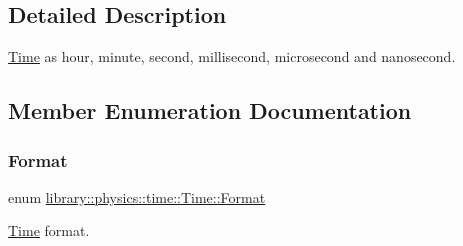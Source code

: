 \subsection{Detailed Description}
\hyperlink{classlibrary_1_1physics_1_1time_1_1_time}{Time} as hour, minute, second, millisecond, microsecond and nanosecond. 

\subsection{Member Enumeration Documentation}
\mbox{\label{classlibrary_1_1physics_1_1time_1_1_time_a7cfbcbb1d5d0c536e28e61f1e7cbf1c8}} 
\subsubsection{\texorpdfstring{Format}{Format}}
{\footnotesize\ttfamily enum \hyperlink{classlibrary_1_1physics_1_1time_1_1_time_a7cfbcbb1d5d0c536e28e61f1e7cbf1c8}{library\+::physics\+::time\+::\+Time\+::\+Format}\hspace{0.3cm}{\ttfamily [strong]}}



\hyperlink{classlibrary_1_1physics_1_1time_1_1_time}{Time} format. 


